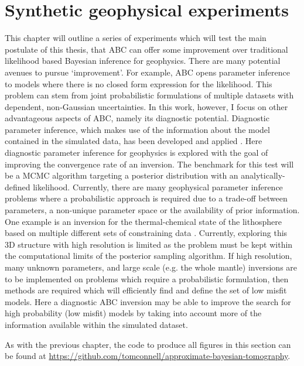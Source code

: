 \chapter{Synthetic geophysical experiments}
\label{SGE}
This chapter will outline a series of experiments which will test the main postulate of this thesis, that ABC can offer some improvement over traditional likelihood based Bayesian inference for geophysics. There are many potential avenues to pursue `improvement'. For example, ABC opens parameter inference to models where there is no closed form expression for the likelihood. This problem can stem from joint probabilistic formulations of multiple datasets with dependent, non-Gaussian uncertainties. In this work, however, I focus on other advantageous aspects of ABC, namely its diagnostic potential. Diagnostic parameter inference, which makes use of the information about the model contained in the simulated data, has been developed and applied \citep{Ratmann2009,vrugt2013toward}. Here diagnostic parameter inference for geophysics is explored with the goal of improving the convergence rate of an inversion. The benchmark for this test will be a MCMC algorithm targeting a posterior distribution with an analytically-defined likelihood. Currently, there are many geophysical parameter inference problems where a probabilistic approach is required due to a trade-off between parameters, a non-unique parameter space or the availability of prior information. One example is an inversion for the thermal-chemical state of the lithosphere based on multiple different sets of constraining data \citep{afonso2013a,afonso2013b}. Currently, exploring this 3D structure with high resolution is limited as the problem must be kept within the computational limits of the posterior sampling algorithm. If high resolution, many unknown parameters, and large scale (e.g. the whole mantle) inversions are to be implemented on problems which require a probabilistic formulation, then methods are required which will efficiently find and define the set of low misfit models. Here a diagnostic ABC inversion may be able to improve the search for high probability (low misfit) models by taking into account more of the information available within the simulated dataset. \par

As with the previous chapter, the code to produce all figures in this section can be found at \url{https://github.com/tomconnell/approximate-bayesian-tomography}.\par


